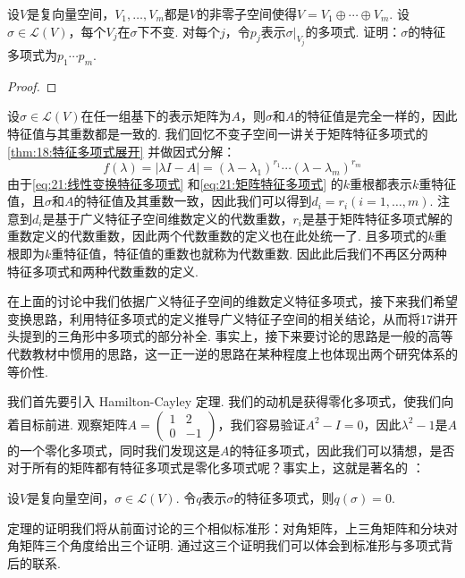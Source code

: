 \begin{example}
    设$V$是复向量空间，$V_1,\ldots,V_m$都是$V$的非零子空间使得$V=V_1\oplus\cdots\oplus V_m$. 设$\sigma\in \mathcal{L}(V)$，每个$V_j$在$\sigma$下不变. 对每个$j$，令$p_j$表示$\sigma|_{V_j}$的多项式. 证明：$\sigma$的特征多项式为$p_1\cdots p_m$.
\end{example}

\begin{proof}

\end{proof}

设$\sigma\in\mathcal{L}(V)$在任一组基下的表示矩阵为$A$，则$\sigma$和$A$的特征值是完全一样的，因此特征值与其重数都是一致的. 我们回忆不变子空间一讲关于矩阵特征多项式的\autoref{thm:18:特征多项式展开} 并做因式分解：
\begin{equation}\label{eq:21:矩阵特征多项式}
    f(\lambda)=|\lambda I-A|=(\lambda-\lambda_1)^{r_1}\cdots(\lambda-\lambda_m)^{r_m}
\end{equation}
由于\autoref{eq:21:线性变换特征多项式} 和\autoref{eq:21:矩阵特征多项式} 的$k$重根都表示$k$重特征值，且$\sigma$和$A$的特征值及其重数一致，因此我们可以得到$d_i=r_i(i=1,\ldots,m)$. 注意到$d_i$是基于广义特征子空间维数定义的代数重数，$r_i$是基于矩阵特征多项式解的重数定义的代数重数，因此两个代数重数的定义也在此处统一了. 且多项式的$k$重根即为$k$重特征值，特征值的重数也就称为代数重数. 因此此后我们不再区分两种特征多项式和两种代数重数的定义.

在上面的讨论中我们依据广义特征子空间的维数定义特征多项式，接下来我们希望变换思路，利用特征多项式的定义推导广义特征子空间的相关结论，从而将17讲开头提到的三角形中多项式的部分补全. 事实上，接下来要讨论的思路是一般的高等代数教材中惯用的思路，这一正一逆的思路在某种程度上也体现出两个研究体系的等价性.

我们首先要引入 Hamilton-Cayley 定理. 我们的动机是获得零化多项式，使我们向着目标前进. 观察矩阵$A=\begin{pmatrix}
        1 & 2 \\ 0 & -1
    \end{pmatrix}$，我们容易验证$A^2-I=0$，因此$\lambda^2-1$是$A$的一个零化多项式，同时我们发现这是$A$的特征多项式，因此我们可以猜想，是否对于所有的矩阵都有特征多项式是零化多项式呢？事实上，这就是著名的 ：
\begin{theorem} \label{thm:21:HC} 
    设$V$是复向量空间，$\sigma\in \mathcal{L}(V)$. 令$q$表示$\sigma$的特征多项式，则$q(\sigma)=0$.
\end{theorem}
定理的证明我们将从前面讨论的三个相似标准形：对角矩阵，上三角矩阵和分块对角矩阵三个角度给出三个证明. 通过这三个证明我们可以体会到标准形与多项式背后的联系.

